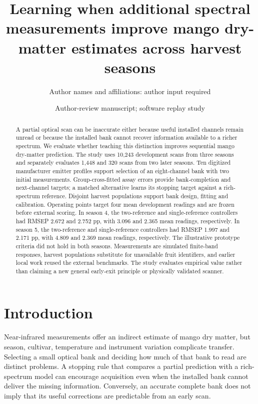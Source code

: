 \documentclass[11pt,a4paper]{article}
\title{Learning when additional spectral measurements improve mango dry-matter estimates across harvest seasons}
\author{Author names and affiliations: author input required}
\date{Author-review manuscript; software replay study}
\begin{document}
\maketitle
\begin{abstract}
A partial optical scan can be inaccurate either because useful installed channels remain unread or because the installed bank cannot recover information available to a richer spectrum. We evaluate whether teaching this distinction improves sequential mango dry-matter prediction. The study uses 10,243 development scans from three seasons and separately evaluates 1,448 and 320 scans from two later seasons. Ten digitized manufacturer emitter profiles support selection of an eight-channel bank with two initial measurements. Group-cross-fitted assay errors provide bank-completion and next-channel targets; a matched alternative learns its stopping target against a rich-spectrum reference. Disjoint harvest populations support bank design, fitting and calibration. Operating points target four mean development readings and are frozen before external scoring. In season 4, the two-reference and single-reference controllers had RMSEP 2.672 and 2.752 pp, with 3.096 and 2.365 mean readings, respectively. In season 5, the two-reference and single-reference controllers had RMSEP 1.997 and 2.171 pp, with 4.809 and 2.369 mean readings, respectively. The illustrative prototype criteria did not hold in both seasons. Measurements are simulated finite-band responses, harvest populations substitute for unavailable fruit identifiers, and earlier local work reused the external benchmarks. The study evaluates empirical value rather than claiming a new general early-exit principle or physically validated scanner.
\end{abstract}

\section{Introduction}
Near-infrared measurements offer an indirect estimate of mango dry matter, but season, cultivar, temperature and instrument variation complicate transfer. Selecting a small optical bank and deciding how much of that bank to read are distinct problems. A stopping rule that compares a partial prediction with a rich-spectrum model can encourage acquisition even when the installed bank cannot deliver the missing information. Conversely, an accurate complete bank does not imply that its useful corrections are predictable from an early scan.
\end{document}
